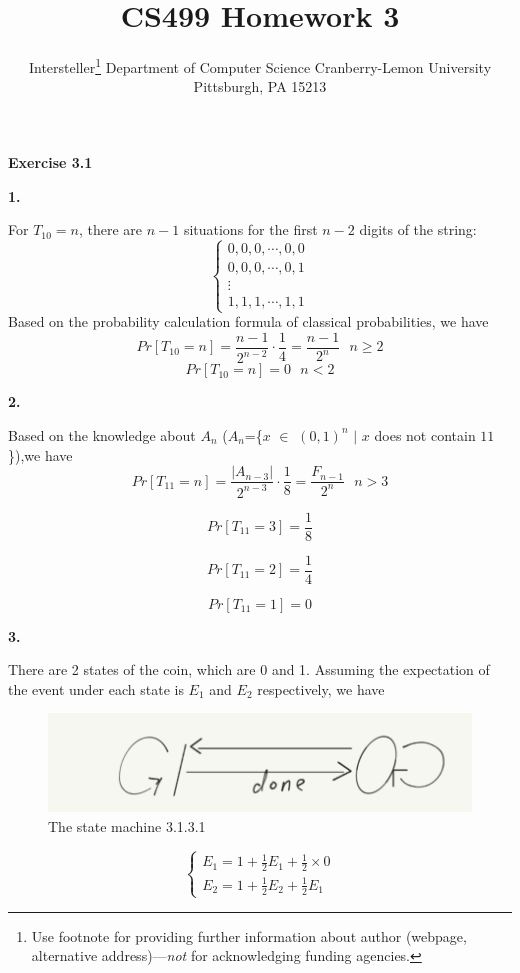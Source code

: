 \documentclass{article} %
\title{CS499 Homework 3}
\author{
	Intersteller\thanks{ Use footnote for providing further information
		about author (webpage, alternative address)---\emph{not} for acknowledging
		funding agencies.}
	Department of Computer Science
	Cranberry-Lemon University
	Pittsburgh, PA 15213
}
\begin{document}
	
	
	\maketitle
	
	
	\textbf{Exercise 3.1}\par
    \textbf{1.}\par
    For $T_{10}=n$, there are $n-1$ situations for the first $n-2$ digits of the string:
    $$ \left\{
    \begin{aligned}
    0,0,0,\cdots,0,0 \\
    0,0,0,\cdots,0,1 \\
    \vdots\\
    1,1,1,\cdots,1,1
    \end{aligned}
    \right.
    $$
    Based on the probability calculation formula of classical probabilities, we have
    $$
    Pr\left[T_{10}=n\right]=\frac{n-1}{2^{n-2}}\cdot\frac{1}{4}=\frac{n-1}{2^n}\ \ \ n\geq2$$
    $$
    Pr\left[T_{10}=n\right]=0\ \ \ n<2
    $$
    
    \textbf{2.}\par
    Based on the knowledge about $A_n$ ($A_n$=\{$x$ $\in$ $(0,1)^n$ $|$ $x$ does not contain $11$\}),we have
    $$
    Pr\left[T_{11}=n\right]=\frac{|A_{n-3}|}{2^{n-3}}\cdot\frac{1}{8}=\frac{F_{n-1}}{2^n}\ \ \ n>3
	$$

    $$
    Pr[T_{11}=3]=\frac{1}{8}
    $$

    $$
    Pr[T_{11}=2]=\frac{1}{4}
    $$

    $$
    Pr[T_{11}=1]=0
    $$
    
    \textbf{3.}\par
    There are 2 states of the coin, which are 0 and 1. Assuming the expectation of the event under each state is $E_1$ and $E_2$ respectively, we have

    \begin{figure}[H]
		\centering
		\includegraphics[scale=0.5]{Zzz1.png}
		\caption{The state machine 3.1.3.1}
		\label{fig:1}
	\end{figure}

    $$ 
    \begin{cases}
    E_1=1+\frac{1}{2}E_1+\frac{1}{2} \times 0 \\
    E_2=1+\frac{1}{2}E_2+\frac{1}{2}E_1 
    \end{cases}
    $$
    
\end{document}
